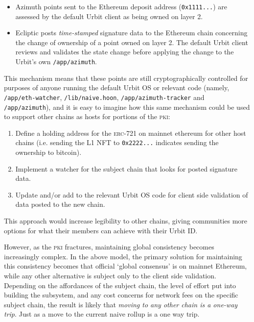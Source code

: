 \documentclass[twoside]{article}
\begin{document}
\begin{itemize}
  \item  Azimuth points sent to the Ethereum deposit address (\lstinline[style=inlinecode]{0x1111...}) are assessed by the default Urbit client as being owned on layer 2.
  \item  Ecliptic posts \emph{time-stamped} signature data to the Ethereum chain concerning the change of ownership of a point owned on layer 2.  The default Urbit client reviews and validates the state change before applying the change to the Urbit's own \lstinline[style=inlinecode]{/app/azimuth}.
\end{itemize}

This mechanism means that these points are still cryptographically controlled for purposes of anyone running the default Urbit OS or relevant code (namely, \lstinline[style=inlinecode]{/app/eth-watcher}, \lstinline[style=inlinecode]{/lib/naive.hoon}, \lstinline[style=inlinecode]{/app/azimuth-tracker} and \lstinline[style=inlinecode]{/app/azimuth}), and it is easy to imagine how this same mechanism could be used to support other chains as hosts for portions of the \textsc{pki}:

\begin{enumerate}
  \item  Define a holding address for the \textsc{erc}-721 on mainnet ethereum for other host chains (i.e. sending the L1 NFT to \lstinline[style=inlinecode]{0x2222...} indicates sending the ownership to bitcoin).
  \item  Implement a watcher for the subject chain that looks for posted signature data.
  \item  Update and/or add to the relevant Urbit OS code for client side validation of data posted to the new chain.
\end{enumerate}

\noindent
This approach would increase legibility to other chains, giving communities more options for what their members can achieve with their Urbit ID.

However, as the \textsc{pki} fractures, maintaining global consistency becomes increasingly complex. In the above model, the primary solution for maintaining this consistency becomes that official `global consensus' is on mainnet Ethereum, while any other alternative is subject only to the client side validation. Depending on the affordances of the subject chain, the level of effort put into building the subsystem, and any cost concerns for network fees on the specific subject chain, the result is likely that \emph{moving to any other chain is a one-way trip}. Just as a move to the current naive rollup is a one way trip.
\end{document}
